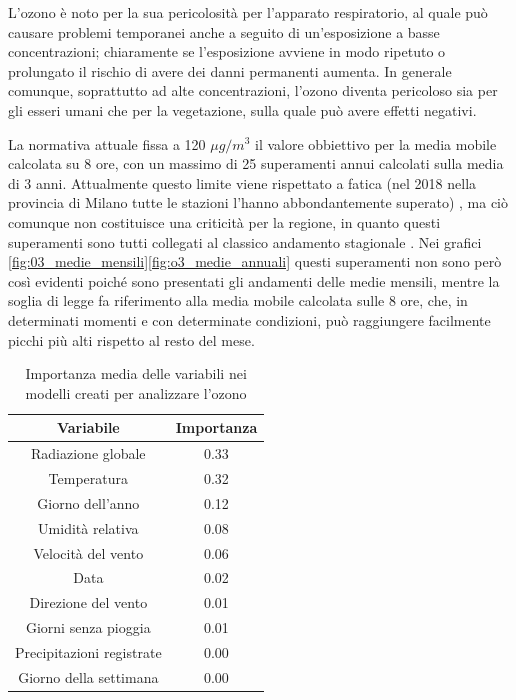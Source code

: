 L'ozono è noto per la sua pericolosità per l'apparato respiratorio, al quale può causare problemi temporanei anche a seguito di un'esposizione a basse concentrazioni; chiaramente se l'esposizione avviene in modo ripetuto o prolungato il rischio di avere dei danni permanenti aumenta. In generale comunque, soprattutto ad alte concentrazioni, l'ozono diventa pericoloso sia per gli esseri umani che per la vegetazione, sulla quale può avere effetti negativi.

La normativa attuale fissa a 120 $\mu g/m^3$ il valore obbiettivo per la media mobile calcolata su 8 ore, con un massimo di 25 superamenti annui calcolati sulla media di 3 anni. Attualmente questo limite viene rispettato a fatica (nel 2018 nella provincia di Milano tutte le stazioni l'hanno abbondantemente superato)
, ma ciò comunque non costituisce una criticità per la regione, in quanto questi superamenti sono tutti collegati al classico andamento stagionale \cite{arpa2018rapporto}. Nei grafici \ref{fig:03_medie_mensili}\ref{fig:o3_medie_annuali} questi superamenti non sono però così evidenti poiché sono presentati gli andamenti delle medie mensili, mentre la soglia di legge fa riferimento alla media mobile calcolata sulle 8 ore, che, in determinati momenti e con determinate condizioni, può raggiungere facilmente picchi più alti rispetto al resto del mese.

\begin{table}[h!]
\centering
\begin{tabular}{ |c c| }
	\hline
	Variabile & Importanza \\
	\hline
	Radiazione globale & 0.33 \\
	Temperatura & 0.32 \\
	Giorno dell'anno & 0.12 \\
	Umidità relativa & 0.08 \\
	Velocità del vento & 0.06 \\
	Data & 0.02 \\
	Direzione del vento & 0.01 \\
	Giorni senza pioggia & 0.01 \\
	Precipitazioni registrate & 0.00 \\
	Giorno della settimana & 0.00 \\
	\hline
\end{tabular}
\caption{Importanza media delle variabili nei modelli creati per analizzare l'ozono}
\label{table:importanza_o3}
\end{table}

